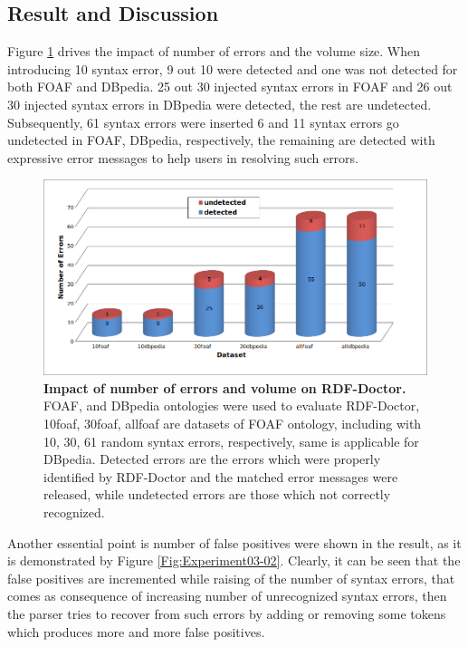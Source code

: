 \subsection{Result and Discussion}
Figure \ref{Fig:Experiment03-01} drives the impact of number of errors and the volume size. When introducing 10 syntax error, 9 out 10 were detected and one was not detected for both FOAF and DBpedia. 25 out 30 injected syntax errors in FOAF and 26 out 30 injected syntax errors in DBpedia were detected, the rest are undetected. Subsequently, 61 syntax errors were inserted 6 and 11 syntax errors go undetected in FOAF, DBpedia, respectively, the remaining are detected with expressive error messages to help users in resolving such errors. 
\begin{figure}[ht]
\begin{center}
		\includegraphics[scale=0.49,angle=0]{images/Experiment03-01.png}
				\setlength\belowcaptionskip{-5mm}

		\caption{\textbf{Impact of number of errors and volume on RDF-Doctor.} FOAF, and DBpedia ontologies were used to evaluate RDF-Doctor, 10foaf, 30foaf, allfoaf are datasets of FOAF ontology, including with 10, 30, 61 random syntax errors, respectively, same is applicable for DBpedia. Detected errors are the errors which were properly identified by RDF-Doctor and the matched error messages were released, while undetected errors are those which not correctly recognized.}
		\label{Fig:Experiment03-01}

\end{center}
\end{figure}


Another essential point is number of false positives were shown in the result, as it is demonstrated  by Figure \ref{Fig:Experiment03-02}. Clearly, it can be seen that the false positives  are incremented while raising of the number of syntax errors, that comes as consequence of increasing number of unrecognized syntax errors, then the parser tries to recover from such errors by adding or removing some tokens which produces more and more false positives.   





